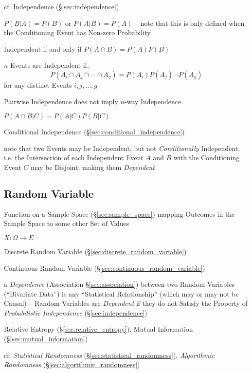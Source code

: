 \fist cf. Independence (\S\ref{sec:independence})

$P(B|A) = P(B)$ or $P(A|B) = P(A)$ -- note that this is only defined when the
Conditioning Event has Non-zero Probability

Independent if and only if $P(A \cap B) = P(A) P(B)$

$n$ Events are Independent if:
\[
  P(A_i \cap A_j \cap \cdots \cap A_g) = P(A_i)P(A_j) \cdots P(A_g)
\]
for any distinct Events $i,j,\ldots,g$

Pairwise Independence does not imply $n$-way Independence

$P(A \cap B | C) = P(A|C)P(B|C)$

\fist Conditional Independence (\S\ref{sec:conditional_independence})

note that two Events may be Independent, but not \emph{Conditionally}
Independent, i.e. the Intersection of each Independent Event $A$ and $B$ with
the Conditioning Event $C$ may be Disjoint, making them \emph{Dependent}



\subsection{Random Variable}\label{sec:random_variable}

Function on a Sample Space (\S\ref{sec:sample_space}) mapping Outcomes in the
Sample Space to some other Set of Values

$X : \Omega \rightarrow E$

Discrete Random Variable (\S\ref{sec:discrete_random_variable})

Continuous Random Variable (\S\ref{sec:continuous_random_variable})

a \emph{Dependence} (Association \S\ref{sec:association}) between two Random
Variables (``Bivariate Data'') is any ``Statistical Relationship'' (which may
or may not be Causal) --
Random Variables are \emph{Dependent} if they do not Satisfy the Property of
\emph{Probabilistic Independence} (\S\ref{sec:independence})

\fist Relative Entropy (\S\ref{sec:relative_entropy}), Mutual Information
(\S\ref{sec:mutual_information})

cf. \emph{Statistical Randomness} (\S\ref{sec:statistical_randomness}),
\emph{Algorithmic Randomness} (\S\ref{sec:algorithmic_randomness})

